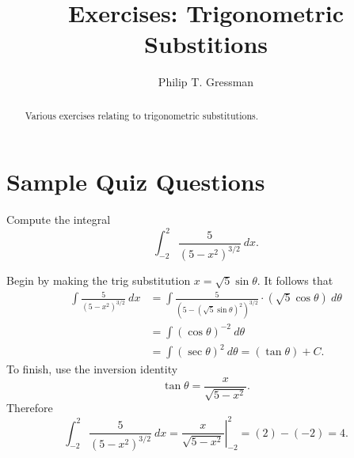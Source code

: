 \documentclass{ximera}
\title{Exercises: Trigonometric Substitions}
\author{Philip T. Gressman}
\begin{document}
\begin{abstract}
Various exercises relating to trigonometric substitutions.
\end{abstract}
\maketitle


\section*{Sample Quiz Questions}
\begin{question}%

Compute the integral 
\[\int_{-2}^{2}\frac{5}{(5-x^2)^{3/2}}~dx.\]
\begin{multiplechoice}
\end{multiplechoice}
\begin{feedback}
Begin by making the trig substitution \(x=\sqrt{5}\sin \theta\). It follows that 
\[ \begin{aligned} \int\frac{5}{(5-x^2)^{3/2}}~dx & = \int \frac{5}{(5-(\sqrt{5}\sin \theta)^2)^{3/2}} \cdot (\sqrt{5}\cos \theta)~d \theta \\
 & = \int (\cos \theta)^{-2}~d \theta \\ & = \int (\sec \theta)^{2} ~ d \theta = (\tan \theta) + C. \end{aligned} \]
To finish, use the inversion identity \[\tan \theta = \frac{x}{\sqrt{5-x^2}}.\]
Therefore \[\int_{-2}^{2}\frac{5}{(5-x^2)^{3/2}}~dx = \left.\frac{x}{\sqrt{5-x^2}}\right|_{-2}^{2} = \left(2\right) - \left(-2\right) = 4.\]
\end{feedback}

\end{question}
\end{document}
